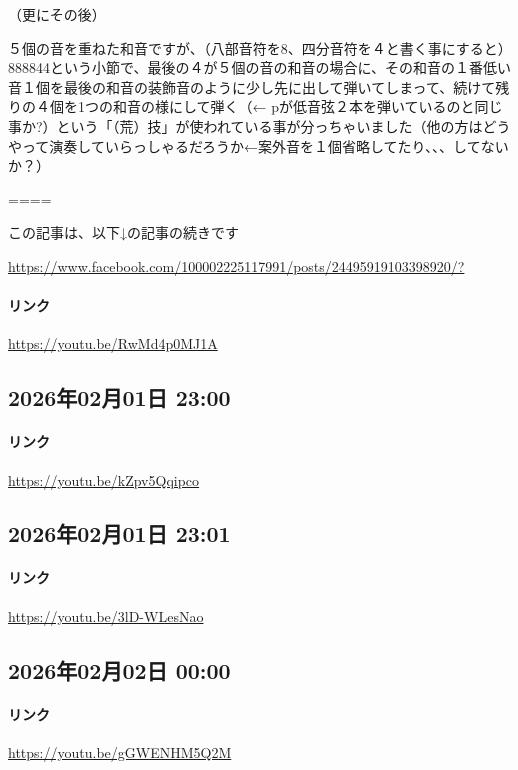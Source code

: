（更にその後）

５個の音を重ねた和音ですが、（八部音符を8、四分音符を４と書く事にすると）888844という小節で、最後の４が５個の音の和音の場合に、その和音の１番低い音１個を最後の和音の装飾音のように少し先に出して弾いてしまって、続けて残りの４個を1つの和音の様にして弾く（← pが低音弦２本を弾いているのと同じ事か?）という「（荒）技」が使われている事が分っちゃいました（他の方はどうやって演奏していらっしゃるだろうか←案外音を１個省略してたり、、、してないか？）

====

この記事は、以下↓の記事の続きです

\url{https://www.facebook.com/100002225117991/posts/24495919103398920/?}

\paragraph{リンク}
\url{https://youtu.be/RwMd4p0MJ1A}

\subsection*{2026年02月01日 23:00}

\paragraph{リンク}
\url{https://youtu.be/kZpv5Qqipco}

\subsection*{2026年02月01日 23:01}

\paragraph{リンク}
\url{https://youtu.be/3lD-WLesNao}

\subsection*{2026年02月02日 00:00}

\paragraph{リンク}
\url{https://youtu.be/gGWENHM5Q2M}

